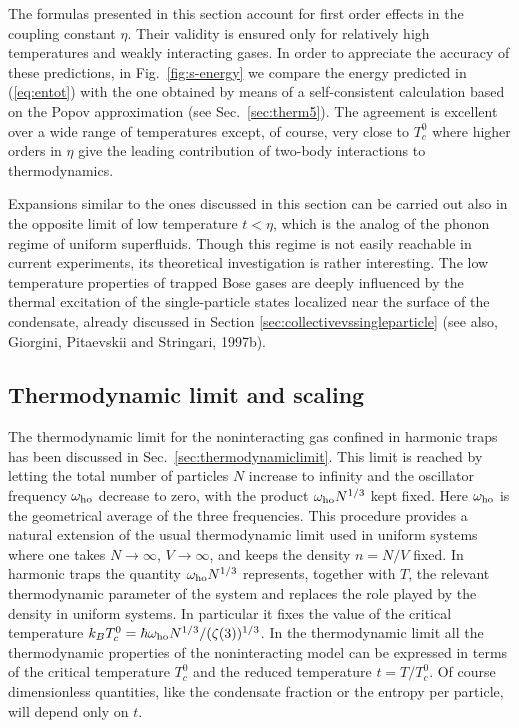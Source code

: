 The formulas presented in this section account for first order effects
in the coupling constant $\eta$. Their validity is ensured only for relatively
high  temperatures and weakly interacting gases. In order to appreciate the
accuracy of these predictions, in Fig.~\ref{fig:s-energy} we compare
the energy predicted in (\ref{eq:entot}) with the one obtained by means of
a self-consistent calculation based on the Popov approximation (see
Sec.~\ref{sec:therm5}).  The agreement is excellent over a wide range of
temperatures except, of course, very close to $T_c^0$ where higher orders 
in $\eta$ give the leading contribution of two-body interactions to 
thermodynamics. 

Expansions similar to the ones discussed in this section can be carried out 
also in the opposite limit of low temperature $t<\eta$, which is the 
analog of the phonon regime of uniform superfluids. Though this 
regime is not easily reachable in current experiments, its theoretical
investigation is rather interesting. The low temperature properties of 
trapped Bose gases are deeply influenced by the thermal excitation of 
the single-particle states localized near the surface of the condensate,
already discussed in Section \ref{sec:collectivevssingleparticle} 
(see also, Giorgini, Pitaevskii and Stringari, 1997b).


\subsection{Thermodynamic limit and scaling}
\label{sec:therm4}

The thermodynamic limit for the noninteracting gas confined in
harmonic traps has been discussed in Sec.~\ref{sec:thermodynamiclimit}.
This limit is reached by letting the total number of particles $N$ increase 
to infinity and the  oscillator frequency $\omega_{\rm ho}$ decrease to
zero, with the product $\omega_{\rm ho}N^{1/3}$  kept fixed. Here
$\omega_{\rm ho}$ is the geometrical average of the three frequencies.
This procedure provides  a natural extension of the usual
thermodynamic limit used in uniform systems where one takes
$N\to\infty$, $V\to\infty$, and keeps the density $n=N/V$  fixed.
In harmonic traps the quantity $\omega_{\rm ho}N^{1/3}$  represents,
together with $T$, the relevant thermodynamic parameter of the
system and replaces the role played by the density in  uniform
systems. In particular it fixes the value of the critical temperature
$k_BT_c^0=\hbar\omega_{\rm ho} N^{1/3}/(\zeta(3))^{1/3}$.
In the thermodynamic limit   all the thermodynamic properties of
the noninteracting model can be expressed  in terms of
the critical temperature $T_c^0$ and the reduced temperature
$t=T/T_c^0$.  Of course dimensionless quantities, like the condensate
fraction or the entropy per particle, will depend only on $t$.

